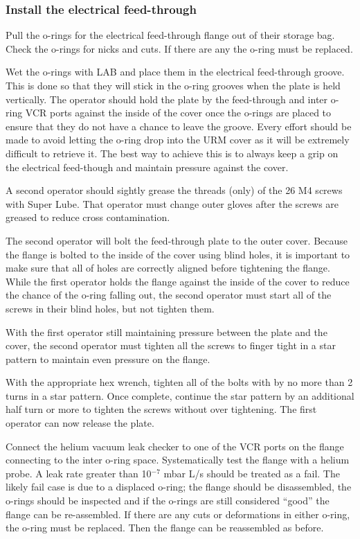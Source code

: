 \documentclass[11pt]{article}
\begin{document}
\subsubsection{Install the electrical feed-through}
\begin{answerlist}
\item Pull the o-rings for the electrical feed-through flange out of
  their storage bag. Check the o-rings for nicks and cuts. If there
  are any the o-ring must be replaced.
\item Wet the o-rings with LAB and place them in the electrical
  feed-through groove. This is done so that they will stick in the
  o-ring grooves when the plate is held vertically. The operator
  should hold the plate by the feed-through and inter o-ring VCR ports
  against the inside of the cover once the o-rings are placed to
  ensure that they do not have a chance to leave the groove. Every
  effort should be made to avoid letting the o-ring drop into the URM
  cover as it will be extremely difficult to retrieve it. The best way
  to achieve this is to always keep a grip on the electrical feed-though
  and maintain pressure against the cover.
\item A second operator should sightly grease the threads (only) of
  the 26 M4 screws with Super Lube. That operator must change outer
  gloves after the screws are greased to reduce cross contamination.
\item The second operator will bolt the feed-through plate to the
  outer cover. Because the flange is bolted to the inside of the cover
  using blind holes, it is important to make sure that all of holes
  are correctly aligned before tightening the flange. While the first
  operator holds the flange against the inside of the cover to reduce
  the chance of the o-ring falling out, the second operator must start
  all of the screws in their blind holes, but not tighten them.
\item With the first operator still maintaining pressure between the
  plate and the cover, the second operator must tighten all the screws
  to finger tight in a star pattern to maintain even pressure on the
  flange. 
\item With the appropriate hex wrench, tighten all of the bolts with
  by no more than 2 turns in a star pattern. Once complete, continue
  the star pattern by an additional half turn or more to tighten the
  screws without over tightening. The first operator can now release
  the plate.
\item Connect the helium vacuum leak checker to one of the VCR ports
  on the flange connecting to the inter o-ring space. Systematically
  test the flange with a helium probe. A leak rate greater than
  10$^{-7}$ mbar L/s should be treated as a fail. The likely fail case
  is due to a displaced o-ring; the flange should be disassembled, the
  o-rings should be inspected and if the o-rings are still considered
  ``good'' the flange can be re-assembled. If there are any cuts or
  deformations in either o-ring, the o-ring must be replaced. Then the
  flange can be reassembled as before.
\end{answerlist}
\end{document}
